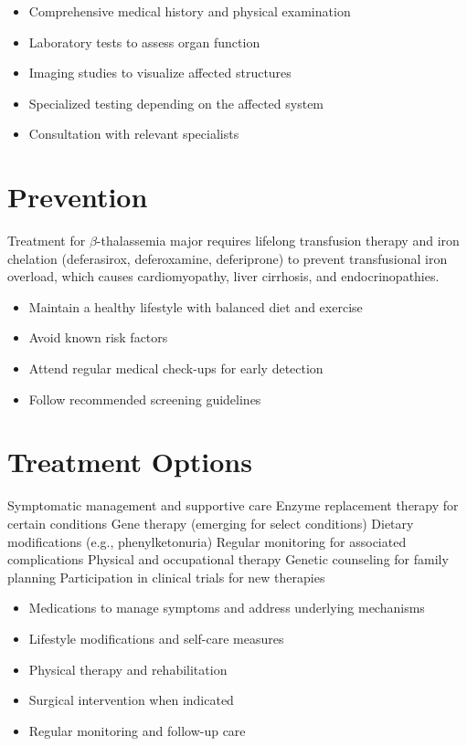 \begin{itemize}[noitemsep]
  \item Comprehensive medical history and physical examination
  \item Laboratory tests to assess organ function
  \item Imaging studies to visualize affected structures
  \item Specialized testing depending on the affected system
  \item Consultation with relevant specialists
\end{itemize}
\section{Prevention}
Treatment for $\beta$-thalassemia major requires lifelong transfusion therapy and iron chelation (deferasirox, deferoxamine, deferiprone) to prevent transfusional iron overload, which causes cardiomyopathy, liver cirrhosis, and endocrinopathies.

\begin{itemize}[noitemsep]
  \item Maintain a healthy lifestyle with balanced diet and exercise
  \item Avoid known risk factors
  \item Attend regular medical check-ups for early detection
  \item Follow recommended screening guidelines
\end{itemize}
\section{Treatment Options}
Symptomatic management and supportive care Enzyme replacement therapy for certain conditions Gene therapy (emerging for select conditions) Dietary modifications (e.g., phenylketonuria) Regular monitoring for associated complications Physical and occupational therapy Genetic counseling for family planning Participation in clinical trials for new therapies

\begin{itemize}[noitemsep]
  \item Medications to manage symptoms and address underlying mechanisms
  \item Lifestyle modifications and self-care measures
  \item Physical therapy and rehabilitation
  \item Surgical intervention when indicated
  \item Regular monitoring and follow-up care
\end{itemize}
